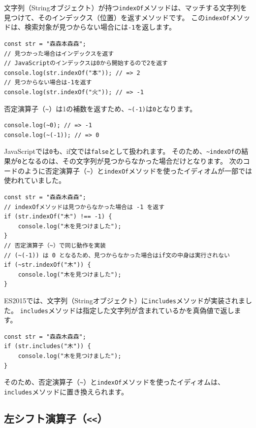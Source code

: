 文字列（Stringオブジェクト）が持つ\texttt{indexOf}メソッドは、マッチする文字列を見つけて、そのインデックス（位置）を返すメソッドです。
この\texttt{indexOf}メソッドは、検索対象が見つからない場合には\texttt{-1}を返します。

\begin{lstlisting}
const str = "森森本森森";
// 見つかった場合はインデックスを返す
// JavaScriptのインデックスは0から開始するので2を返す
console.log(str.indexOf("本")); // => 2
// 見つからない場合は-1を返す
console.log(str.indexOf("火")); // => -1
\end{lstlisting}

否定演算子（\lstinline{~}）は1の補数を返すため、\lstinline{~(-1)}は\texttt{0}となります。

\begin{lstlisting}
console.log(~0); // => -1
console.log(~(-1)); // => 0
\end{lstlisting}

JavaScriptでは\texttt{0}も、if文では\texttt{false}として扱われます。
そのため、\lstinline{~indexOf}の結果が\texttt{0}となるのは、その文字列が見つからなかった場合だけとなります。
次のコードのように否定演算子（\lstinline{~}）と\texttt{indexOf}メソッドを使ったイディオムが一部では使われていました。

\begin{lstlisting}
const str = "森森木森森";
// indexOfメソッドは見つからなかった場合は -1 を返す
if (str.indexOf("木") !== -1) {
    console.log("木を見つけました");
}
// 否定演算子（~）で同じ動作を実装
// (~(-1)) は 0 となるため、見つからなかった場合はif文の中身は実行されない
if (~str.indexOf("木")) {
    console.log("木を見つけました");
}
\end{lstlisting}

ES2015では、文字列（Stringオブジェクト）に\texttt{includes}メソッドが実装されました。
\texttt{includes}メソッドは指定した文字列が含まれているかを真偽値で返します。

\begin{lstlisting}
const str = "森森木森森";
if (str.includes("木")) {
    console.log("木を見つけました");
}
\end{lstlisting}

そのため、否定演算子（\lstinline{~}）と\texttt{indexOf}メソッドを使ったイディオムは、\texttt{includes}メソッドに置き換えられます。

\hypertarget{left-shift}{%
\subsection{\texorpdfstring{左シフト演算子（\texttt{\textless{}\textless{}}）}{左シフト演算子（\textless{}\textless{}）}}\label{left-shift}}

